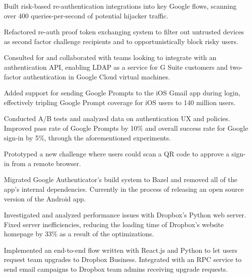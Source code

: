 \documentclass[]{template}
\begin{document}
\hfill
{}
\begin{tightemize}
\item
  Built risk-based re-authentication integrations into key Google flows,
  scanning over 400 queries-per-second of potential hijacker traffic.
\item
  Refactored re-auth proof token exchanging system to filter out untrusted
  devices as second factor challenge recipients and to opportunistically block
  risky users.
\item
  Consulted for and collaborated with
  teams looking to integrate with an authentication API, enabling LDAP as a
  service for G Suite customers and two-factor authentication in Google Cloud
  virtual machines.
\item
  Added support for sending Google Prompts to the iOS Gmail app during login,
  effectively tripling Google Prompt coverage for iOS users to 140 million
  users.
\item
  Conducted A/B tests and analyzed data on authentication UX and policies.
  Improved pass rate of Google Prompts by 10\%
  and overall success rate for Google sign-in by 5\%, through the aforementioned
  experiments.
\item
  Prototyped a new challenge where users could scan a QR code to approve a
  sign-in from a remote browser.
\item
  Migrated Google Authenticator's build system to Bazel and removed all of the
  app's internal dependencies. Currently in the process of releasing an open
  source version of the Android app.
\end{tightemize}

\sectionsep

\hfill
{}
\begin{tightemize}
\item
  Investigated and analyzed performance issues with Dropbox's Python web server.
  Fixed server inefficiencies, reducing the loading time of Dropbox's
  website homepage by 33\% as a result of the optimizations.
\item
  Implemented an end-to-end flow written with React.js and Python to let users
  request team upgrades to Dropbox Business. Integrated with an RPC service to
  send email campaigns to Dropbox team admins receiving upgrade requests.
\end{tightemize}
\end{document}
